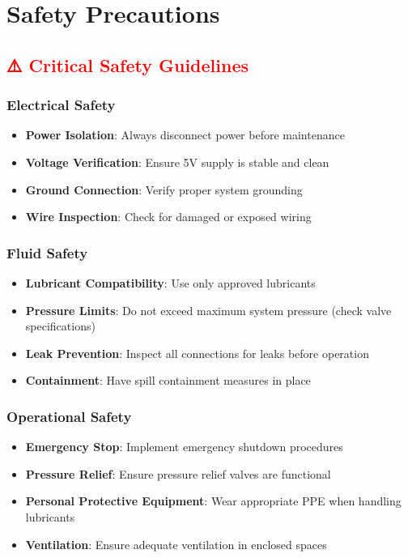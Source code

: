 \documentclass[11pt,a4paper]{article}
\newcommand{\warning}[1]{\textcolor{red}{\textbf{⚠️ #1}}}
\begin{document}
\section{Safety Precautions}

\subsection{\warning{Critical Safety Guidelines}}

\subsubsection{Electrical Safety}
\begin{itemize}
    \item \textbf{Power Isolation}: Always disconnect power before maintenance
    \item \textbf{Voltage Verification}: Ensure 5V supply is stable and clean
    \item \textbf{Ground Connection}: Verify proper system grounding
    \item \textbf{Wire Inspection}: Check for damaged or exposed wiring
\end{itemize}

\subsubsection{Fluid Safety}
\begin{itemize}
    \item \textbf{Lubricant Compatibility}: Use only approved lubricants
    \item \textbf{Pressure Limits}: Do not exceed maximum system pressure (check valve specifications)
    \item \textbf{Leak Prevention}: Inspect all connections for leaks before operation
    \item \textbf{Containment}: Have spill containment measures in place
\end{itemize}

\subsubsection{Operational Safety}
\begin{itemize}
    \item \textbf{Emergency Stop}: Implement emergency shutdown procedures
    \item \textbf{Pressure Relief}: Ensure pressure relief valves are functional
    \item \textbf{Personal Protective Equipment}: Wear appropriate PPE when handling lubricants
    \item \textbf{Ventilation}: Ensure adequate ventilation in enclosed spaces
\end{itemize}
\end{document}
